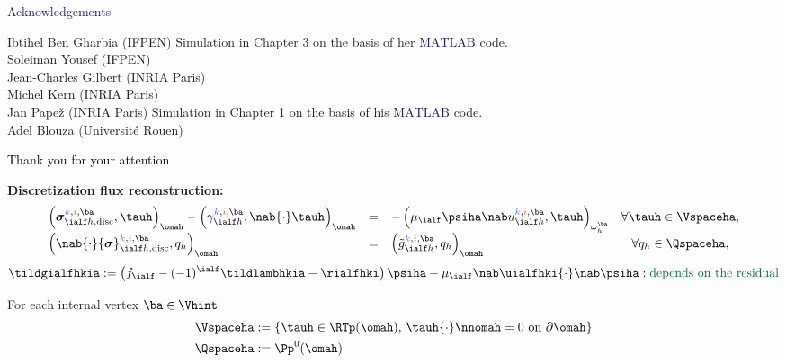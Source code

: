 \begin{frame}
\begin{overprint}

\vspace{0.1 cm}
\begin{center}
\LARGE{\textcolor{midnightblue}{Acknowledgements}}
\end{center}
 Ibtihel Ben Gharbia (IFPEN) Simulation in Chapter 3 on the basis of her \textcolor{midnightblue}{$\mathrm{MATLAB}$} code.
\\
Soleiman Yousef (IFPEN)
\\
Jean-Charles Gilbert (INRIA Paris)
\\
Michel Kern (INRIA Paris)
\\
Jan Pape{\v z} (INRIA Paris) Simulation in Chapter 1 on the basis of his \textcolor{midnightblue}{$\mathrm{MATLAB}$} code.
\\ 
Adel Blouza (Université Rouen)
\newline
\begin{center}
\Huge{\textcolor{black}{Thank you for your attention}}
\end{center}

\textcolor{cadmiumgreen}{\textbf{Discretization flux reconstruction:}}
\begin{equation*}
\begin{array}{lclcc}
\left({\bm \sigma}_{\ialf h, \mathrm{disc}}^{\kk,\ii,\ba}, \tauh\right)_{\omah}- \left(\gamma_{\ialf h}^{\kk,\ii,\ba},\nab {\cdot} \tauh\right)_{\omah}
&=& -\left(\mu_\ialf \psiha \nab u_{\ialf h}^{\kk,\ii,\ba}, \tauh \right)_{\omega_h^{\ba}}
&  \forall \tauh\in \Vspaceha, \\
\left(\nab {\cdot} {\bm \sigma}_{\ialf h, \mathrm{disc}}^{\kk,\ii, \ba}, q_{h}\right)_{\omah}
&=&\left(\tilde{g}_{\ialf h}^{\kk,\ii,\ba}, q_{h}\right)_{\omah}
&  \forall q_{h}\in \Qspaceha,
\end{array}
\end{equation*}
\begin{equation*}
\tildgialfhkia \egaldef \left(f_\ialf -(-1)^{\ialf} \tildlambhkia -\rialfhki \right) \psiha- \mu_\ialf \nab \uialfhki {\cdot} \nab \psiha : \mbox{\textcolor{cadmiumgreen}{depends on the residual}} 
\end{equation*}
\begin{minipage}[c]{0.4 \linewidth}
For each internal vertex $ \ba \in \Vhint$
\vspace{-0.2 cm}
\begin{equation*}
\begin{split}
\Vspaceha & \egaldef
 \left\{\tauh  \in \RTp(\omah), \, \tauh {\cdot} \nnomah=0  \mbox{ on } \partial \omah \right\}\\
\Qspaceha &  \egaldef \Pp^{0}(\omah)
\end{split}
\vspace{-0.2 cm}
\end{equation*}


\end{minipage}
\end{overprint}
\end{frame}

